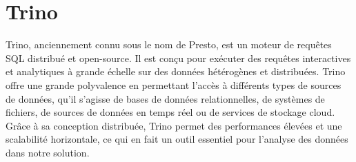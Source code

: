 \section{Trino}

Trino, anciennement connu sous le nom de Presto, est un moteur de requêtes SQL distribué et open-source. Il est conçu pour exécuter des requêtes interactives et analytiques à grande échelle sur des données hétérogènes et distribuées. Trino offre une grande polyvalence en permettant l'accès à différents types de sources de données, qu'il s'agisse de bases de données relationnelles, de systèmes de fichiers, de sources de données en temps réel ou de services de stockage cloud. Grâce à sa conception distribuée, Trino permet des performances élevées et une scalabilité horizontale, ce qui en fait un outil essentiel pour l'analyse des données dans notre solution.